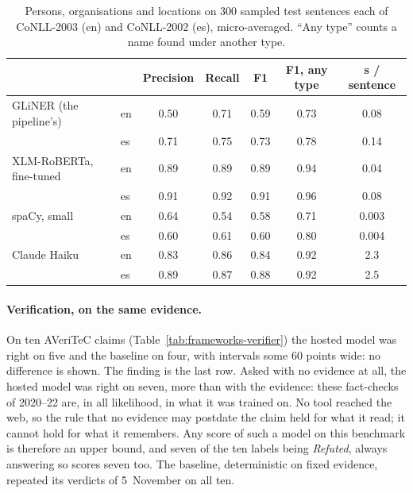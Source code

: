 \begin{table}[ht]
\centering
\small
\begin{tabular}{@{}llccccc@{}}
\toprule
 & & Precision & Recall & F1 & F1, any type & s / sentence \\
\midrule
GLiNER (the pipeline's) & en & 0.50 & 0.71 & 0.59 & 0.73 & 0.08 \\
 & es & 0.71 & 0.75 & 0.73 & 0.78 & 0.14 \\
XLM-RoBERTa, fine-tuned & en & 0.89 & 0.89 & 0.89 & 0.94 & 0.04 \\
 & es & 0.91 & 0.92 & 0.91 & 0.96 & 0.08 \\
spaCy, small & en & 0.64 & 0.54 & 0.58 & 0.71 & 0.003 \\
 & es & 0.60 & 0.61 & 0.60 & 0.80 & 0.004 \\
Claude Haiku & en & 0.83 & 0.86 & 0.84 & 0.92 & 2.3 \\
 & es & 0.89 & 0.87 & 0.88 & 0.92 & 2.5 \\
\bottomrule
\end{tabular}
\caption[Entity recognition on CoNLL]{Persons, organisations and
locations on 300 sampled test sentences each of CoNLL-2003 (en) and
CoNLL-2002 (es), micro-averaged. ``Any type'' counts a name found under
another type.}
\label{tab:frameworks-ner}
\end{table}

\paragraph{Verification, on the same evidence.} On ten AVeriTeC claims
(Table~\ref{tab:frameworks-verifier}) the hosted model was right on five
and the baseline on four, with intervals some 60 points wide: no
difference is shown. The finding is the last row. Asked with no evidence
at all, the hosted model was right on seven, more than with the
evidence: these fact-checks of 2020--22 are, in all likelihood, in what
it was trained on. No tool reached the web, so the rule that no evidence
may postdate the claim held for what it read; it cannot hold for what it
remembers. Any score of such a model on this benchmark is therefore an
upper bound, and seven of the ten labels being \emph{Refuted}, always
answering so scores seven too. The baseline, deterministic on fixed
evidence, repeated its verdicts of 5~November on all ten.

